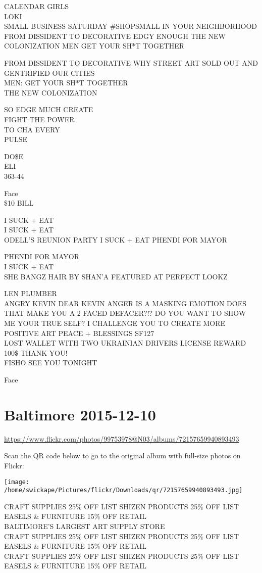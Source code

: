 \documentclass[10pt,letterpaper]{article}
\begin{document}
CALENDAR GIRLS\\
LOKI\\
SMALL BUSINESS SATURDAY \#SHOPSMALL IN YOUR NEIGHBORHOOD\\
FROM DISSIDENT TO DECORATIVE EDGY ENOUGH THE NEW COLONIZATION MEN GET YOUR SH*T TOGETHER

FROM DISSIDENT TO DECORATIVE WHY STREET ART SOLD OUT AND GENTRIFIED OUR CITIES\\
MEN: GET YOUR SH*T TOGETHER\\
THE NEW COLONIZATION

SO EDGE MUCH CREATE\\
FIGHT THE POWER\\
TO CHA EVERY\\
PULSE

DO\$E\\
ELI\\
363{-}44

Face\\
\$10 BILL

I SUCK + EAT\\
I SUCK + EAT\\
ODELL'S REUNION PARTY I SUCK + EAT PHENDI FOR MAYOR

PHENDI FOR MAYOR\\
I SUCK + EAT\\
SHE BANGZ HAIR BY SHAN'A FEATURED AT PERFECT LOOKZ

LEN PLUMBER\\
ANGRY KEVIN DEAR KEVIN ANGER IS A MASKING EMOTION DOES THAT MAKE YOU A 2 FACED DEFACER?!?  DO YOU WANT TO SHOW ME YOUR TRUE SELF?  I CHALLENGE YOU TO CREATE MORE POSITIVE ART PEACE + BLESSINGS SF127\\
LOST WALLET WITH TWO UKRAINIAN DRIVERS LICENSE REWARD 100\$ THANK YOU!\\
FISHO SEE YOU TONIGHT

Face


\section*{Baltimore 2015-12-10}

\url{https://www.flickr.com/photos/99753978@N03/albums/72157659940893493}

Scan the QR code below to go to the original album with full-size photos on Flickr:

\texttt{[image: /home/swickape/Pictures/flickr/Downloads/qr/72157659940893493.jpg]}


CRAFT SUPPLIES 25\% OFF LIST SHIZEN PRODUCTS 25\% OFF LIST EASELS \& FURNITURE 15\% OFF RETAIL\\
BALTIMORE'S LARGEST ART SUPPLY STORE\\
CRAFT SUPPLIES 25\% OFF LIST SHIZEN PRODUCTS 25\% OFF LIST EASELS \& FURNITURE 15\% OFF RETAIL\\
CRAFT SUPPLIES 25\% OFF LIST SHIZEN PRODUCTS 25\% OFF LIST EASELS \& FURNITURE 15\% OFF RETAIL
\end{document}
